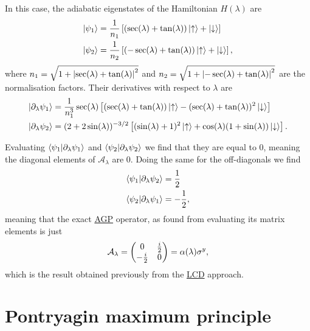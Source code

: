\documentclass[a4paper,oneside,11pt]{book}
\newcommand{\sy}{\sigma^y}
\newcommand{\dlambda}{\partial_{\lambda}}
\newcommand{\AGP}[1]{\mathcal{A}_{#1}}
\newcommand{\acrref}[1]{\hyperref[acr:#1]{#1}}
\begin{document}
In this case, the adiabatic eigenstates of the Hamiltonian $H(\lambda)$ are
\begin{equation}
    \begin{aligned}
        \ket{\psi_1} &= \frac{1}{n_1} \left[(\sec(\lambda) + \tan(\lambda)) \ket{\uparrow} + \ket{\downarrow}\right] \\
        \ket{\psi_2} &= \frac{1}{n_2} \left[(-\sec(\lambda) + \tan(\lambda)) \ket{\uparrow} + \ket{\downarrow}\right],
    \end{aligned}
\end{equation}
where $n_1 = \sqrt{1 + \abs{\sec(\lambda) + \tan(\lambda)}^2}$ and $n_2 = \sqrt{1 + \abs{-\sec(\lambda) + \tan(\lambda)}^2}$ are the normalisation factors. Their derivatives with respect to $\lambda$ are
\begin{equation}
    \begin{aligned}
        \ket{\dlambda \psi_1} &= \frac{1}{n_1^3} \sec(\lambda) \left[(\sec(\lambda) + \tan(\lambda))\ket{\uparrow}  - (\sec(\lambda) + \tan(\lambda))^2 \ket{\downarrow}\right] \\
        \ket{\dlambda \psi_2} &= (2 + 2\sin(\lambda))^{-3/2} \left[(\sin(\lambda) + 1)^2 \ket{\uparrow} + \cos(\lambda)(1 + \sin(\lambda))\ket{\downarrow}\right].
    \end{aligned}
\end{equation}

Evaluating $\braket{\psi_1}{\dlambda \psi_1}$ and $\braket{\psi_2}{\dlambda \psi_2}$ we find that they are equal to $0$, meaning the diagonal elements of $\AGP{\lambda}$ are $0$. Doing the same for the off-diagonals we find 
\begin{equation}
    \begin{aligned}
        \braket{\psi_1}{\dlambda \psi_2} &= \frac{1}{2} \\
        \braket{\psi_2}{\dlambda \psi_1} &= -\frac{1}{2},
    \end{aligned}
\end{equation}
meaning that the exact \acrref{AGP} operator, as found from evaluating its matrix elements is just
\begin{equation}
    \AGP{\lambda} = \mqty(0 & \frac{i}{2} \\ -\frac{i}{2} & 0) = \alpha(\lambda) \sy,
\end{equation}
which is the result obtained previously from the \acrref{LCD} approach. 

\chapter{Pontryagin maximum principle}\label{app:PMP}
\end{document}
